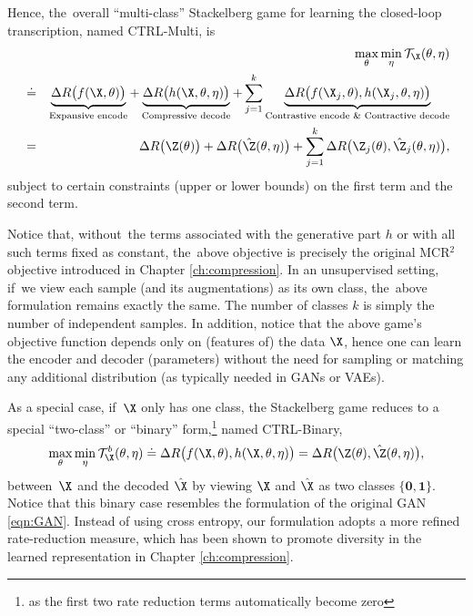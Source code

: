 \documentclass[../../book-main.tex]{subfiles}
\begin{document}
Hence, the~overall ``multi-class''  Stackelberg game for learning the closed-loop transcription, named CTRL-Multi, is
\begin{eqnarray}
&&\max_\theta \min_\eta \mathcal{T}_{\X}(\theta, \eta) \\
&\doteq& \underbrace{\Delta R\big(f(\X,\theta)\big)}_{\text{Expansive encode}} + \underbrace{\Delta R\big(h(\X,\theta, \eta)\big)}_{\text{Compressive decode}} + \sum_{j=1}^k \underbrace{\Delta R\big(f(\X_j,\theta), h(\X_j,\theta,\eta)\big)}_{\text{Contrastive encode \& Contractive decode}} \nonumber \\
&=& \Delta R\big(\Z(\theta) \big) + \Delta R\big(\hat \Z(\theta, \eta)\big) + \sum_{j=1}^k \Delta R\big(\Z_j(\theta), \hat \Z_j(\theta, \eta) \big),
    \label{eq:MCR2-GAN-objective}
\end{eqnarray}
subject to certain constraints (upper or lower bounds) on the first term and the second term.  %



Notice that, without~the terms associated with the generative part $h$ or with all such terms fixed as constant, the~above objective is precisely the original MCR$^2$ objective introduced in Chapter \ref{ch:compression}. In an unsupervised setting, if~we view each sample (and its augmentations) as its own class, the~above formulation remains exactly the same. The number of classes $k$ is simply the number of independent samples. In addition, notice that the above game's objective function depends only on (features of) the data $\X$, hence one can learn the encoder and decoder (parameters) without the need for sampling or matching any additional distribution (as typically needed in GANs or VAEs).

As a special case, if~$\X$ only has one class, the Stackelberg game reduces to a special ``two-class'' or ``binary''  form,\footnote{as the first two rate reduction terms automatically become zero} named CTRL-Binary, 
\begin{equation}
 \max_\theta \min_\eta \mathcal{T}^b_{\X}(\theta, \eta) \doteq \Delta R\big(f(\X,\theta), h(\X,\theta,\eta)\big) = \Delta R\big(\Z(\theta), \hat \Z(\theta, \eta)\big), 
    \label{eq:MCR2-GAN-objective-binary}
\end{equation}
between~$\X$ and the decoded $\hat\X$ by viewing $\X$ and $\hat \X$ as two classes $\{\bm 0, \bm 1\}$. Notice that this binary case resembles the formulation of the original GAN \eqref{eqn:GAN}. Instead of using cross entropy, our formulation adopts a more refined rate-reduction measure, which has been shown to promote diversity in the learned representation in Chapter \ref{ch:compression}. %
\end{document}
